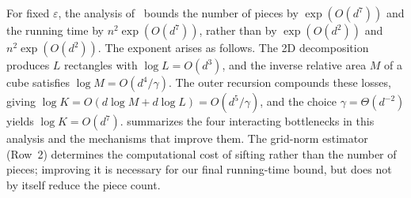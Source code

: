 \documentclass[11pt]{article}
\theoremstyle{definition}
\begin{document}
For fixed $\varepsilon$, the analysis of~\cite{AFKLM24} bounds the number of pieces by $\exp(O(d^7))$ and the running time by $n^2\exp(O(d^7))$, rather than by $\exp(O(d^2))$ and $n^2\exp(O(d^2))$. The exponent arises as follows. The 2D decomposition produces $L$ rectangles with $\log L = O(d^3)$, and the inverse relative area $M$ of a cube satisfies $\log M = O(d^4/\gamma)$. The outer recursion compounds these losses, giving $\log K = O(d\log M + d\log L) = O(d^5/\gamma)$, and the choice $\gamma = \Theta(d^{-2})$ yields $\log K = O(d^7)$.  summarizes the four interacting bottlenecks in this analysis and the mechanisms that improve them. The grid-norm estimator (Row~2) determines the computational cost of sifting rather than the number of pieces; improving it is necessary for our final running-time bound, but does not by itself reduce the piece count.
\end{document}
